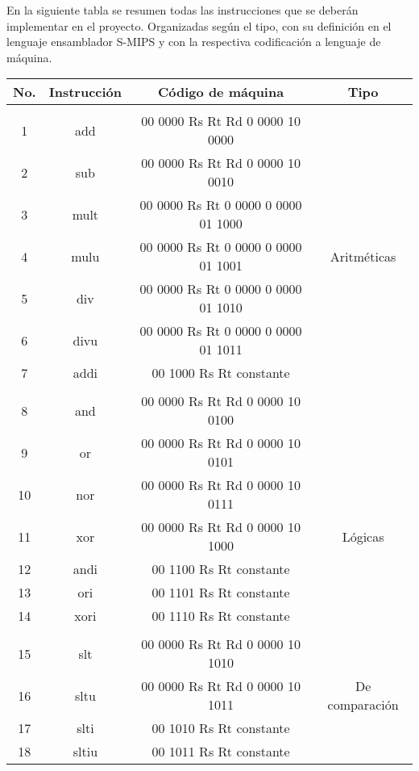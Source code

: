 \documentclass[12pt]{amsart}
\begin{document}
	En la siguiente tabla se resumen todas las instrucciones que se deberán implementar en el proyecto. Organizadas según el tipo, con su definición en el lenguaje ensamblador S-MIPS y con la respectiva codificación a lenguaje de máquina.

\begin{table}[t]
\begin{center}
\begin{tabular}{  | c | c | c | c | }

\hline
No. & Instrucción & Código de máquina & Tipo\\ \hline

& & & \\
1 & add & 00  0000  Rs  Rt  Rd  0 0000 10 0000 & \\
2 & sub & 00  0000  Rs  Rt  Rd 0 0000 10 0010  &\\
3 & mult & 00  0000  Rs  Rt  0 0000 0 0000 01 1000 &\\
4 & mulu & 00  0000  Rs  Rt  0 0000 0 0000 01 1001 & Aritméticas\\
5 & div &	 00  0000  Rs  Rt  0 0000 0 0000 01 1010 &\\
6 & divu & 00  0000  Rs  Rt  0 0000 0 0000 01 1011 &\\
7 & addi & 00 1000  Rs  Rt  constante &\\ \hline

&& &\\
8 & and &			 	00 0000  Rs  Rt  Rd 0 0000 10 0100 &\\
9 & or &				00 0000  Rs  Rt  Rd 0 0000 10 0101 &\\
10 & nor &				00 0000  Rs  Rt  Rd 0 0000 10 0111 &\\
11 & xor &				00 0000  Rs  Rt  Rd 0 0000 10 1000 & Lógicas\\
12 & andi &			 00 1100  Rs   Rt constante &\\
13 & ori &				 00 1101  Rs   Rt constante &\\
14 & xori &				 00 1110  Rs  Rt constante &\\ \hline

&& & \\
15 & slt &				 00 0000  Rs  Rt  Rd 0 0000 10 1010 &\\
16 & sltu &				 00 0000  Rs  Rt  Rd 0 0000 10 1011 & De comparación\\
17 & slti &				 00 1010  Rs  Rt  constante &\\
18 & sltiu &				 00 1011  Rs Rt constante &\\ \hline


\end{tabular}
\end{center}
\end{table}
\end{document}
